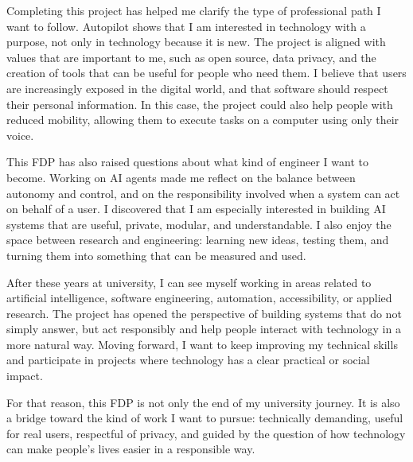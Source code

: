 Completing this project has helped me clarify the type of professional path I want to follow. Autopilot shows that I am interested in technology with a purpose, not only in technology because it is new. The project is aligned with values that are important to me, such as open source, data privacy, and the creation of tools that can be useful for people who need them. I believe that users are increasingly exposed in the digital world, and that software should respect their personal information. In this case, the project could also help people with reduced mobility, allowing them to execute tasks on a computer using only their voice.

This FDP has also raised questions about what kind of engineer I want to become. Working on AI agents made me reflect on the balance between autonomy and control, and on the responsibility involved when a system can act on behalf of a user. I discovered that I am especially interested in building AI systems that are useful, private, modular, and understandable. I also enjoy the space between research and engineering: learning new ideas, testing them, and turning them into something that can be measured and used.

After these years at university, I can see myself working in areas related to artificial intelligence, software engineering, automation, accessibility, or applied research. The project has opened the perspective of building systems that do not simply answer, but act responsibly and help people interact with technology in a more natural way. Moving forward, I want to keep improving my technical skills and participate in projects where technology has a clear practical or social impact.

For that reason, this FDP is not only the end of my university journey. It is also a bridge toward the kind of work I want to pursue: technically demanding, useful for real users, respectful of privacy, and guided by the question of how technology can make people's lives easier in a responsible way.
